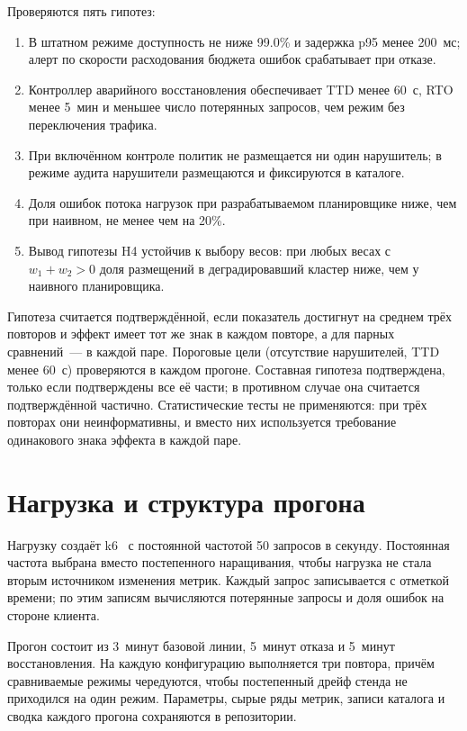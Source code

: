Проверяются пять гипотез:
\begin{enumerate}[label=H\arabic*.]
  \item В штатном режиме доступность не ниже 99.0\% и задержка p95 менее
        200~мс; алерт по скорости расходования бюджета ошибок срабатывает
        при отказе.
  \item Контроллер аварийного восстановления обеспечивает TTD менее 60~с,
        RTO менее 5~мин и меньшее число потерянных запросов, чем режим без
        переключения трафика.
  \item При включённом контроле политик не размещается ни один нарушитель;
        в режиме аудита нарушители размещаются и фиксируются в каталоге.
  \item Доля ошибок потока нагрузок при разрабатываемом планировщике ниже,
        чем при наивном, не менее чем на 20\%.
  \item Вывод гипотезы H4 устойчив к выбору весов: при любых весах с
        $w_1 + w_2 > 0$ доля размещений в деградировавший кластер ниже, чем
        у наивного планировщика.
\end{enumerate}

Гипотеза считается подтверждённой, если показатель достигнут на среднем
трёх повторов и эффект имеет тот же знак в каждом повторе, а для парных
сравнений~--- в каждой паре. Пороговые цели (отсутствие нарушителей, TTD
менее 60~с) проверяются в каждом прогоне. Составная гипотеза подтверждена,
только если подтверждены все её части; в противном случае она считается
подтверждённой частично. Статистические тесты не применяются: при трёх
повторах они неинформативны, и вместо них используется требование
одинакового знака эффекта в каждой паре.

\section{Нагрузка и структура прогона}

Нагрузку создаёт k6~\cite{k6} с постоянной частотой 50 запросов в секунду.
Постоянная частота выбрана вместо постепенного наращивания, чтобы нагрузка не
стала вторым источником изменения метрик. Каждый запрос записывается с
отметкой времени; по этим записям вычисляются потерянные запросы и доля
ошибок на стороне клиента.

Прогон состоит из 3~минут базовой линии, 5~минут отказа и 5~минут
восстановления. На каждую конфигурацию выполняется три повтора, причём
сравниваемые режимы чередуются, чтобы постепенный дрейф стенда не
приходился на один режим. Параметры, сырые ряды метрик, записи каталога и
сводка каждого прогона сохраняются в репозитории.

